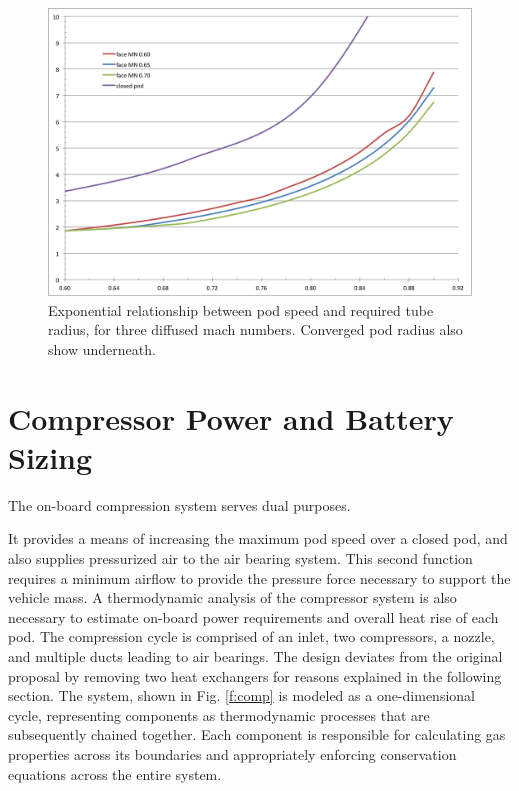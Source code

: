 \documentclass[heading.tex]{subfiles}
\begin{document}
\begin{figure}[H]
\centering
\includegraphics[width=\textwidth]{images/mach_vs_rad4.png}
\caption[Tube and Pod Radius vs Mach]{Exponential relationship between pod speed and required tube radius, for three diffused mach numbers.
Converged pod radius also show underneath. }
\label{f:machRAD}
\end{figure}


\section{Compressor Power and Battery Sizing}
\label{sec:compressor-and-battery}

The on-board compression system serves dual purposes.

It provides a means of increasing the maximum pod speed over a closed pod, and also supplies pressurized air to the air bearing system. This second function requires a minimum airflow to provide the pressure force necessary to support the vehicle mass.
A thermodynamic analysis of the compressor system is also necessary to
estimate on-board power requirements and overall heat rise of each pod.
The compression cycle is comprised of an inlet, two compressors, a nozzle, and multiple ducts leading to air bearings.
The design deviates from the original proposal by removing two heat exchangers for reasons explained in the following section.
The system, shown in Fig. \ref{f:comp} is modeled as a one-dimensional cycle,
representing components as thermodynamic processes that are subsequently chained together.
Each component is responsible for calculating gas properties across its boundaries
and appropriately enforcing conservation equations across the entire system.
\end{document}
